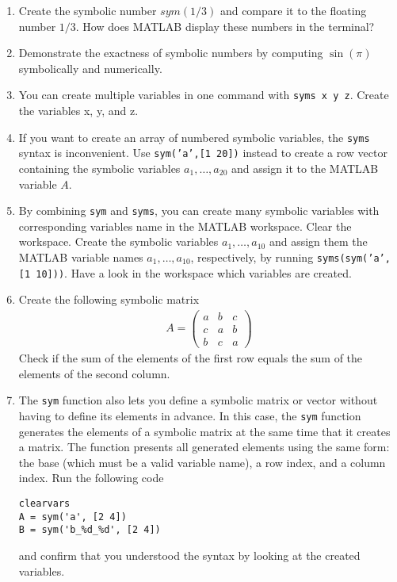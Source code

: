 \begin{enumerate}

\item
Create the symbolic number \(sym(1/3)\) and compare it to the floating number \(1/3\).
How does MATLAB display these numbers in the terminal?

\item
Demonstrate the exactness of symbolic numbers by computing \(\sin(\pi)\) symbolically and numerically.

\item
You can create multiple variables in one command with \texttt{syms x y z}.
Create the variables x, y, and z.

\item
If you want to create an array of numbered symbolic variables, the \texttt{syms} syntax is inconvenient.
Use \texttt{sym{('a',[1 20])}} instead to create a row vector containing the symbolic variables
  \(a_{1},\ldots ,a_{20}\) and assign it to the MATLAB variable \(A\).

\item
By combining \texttt{sym} and \texttt{syms}, you can create many symbolic variables
  with corresponding variables name in the MATLAB workspace.
Clear the workspace.
Create the symbolic variables \(a_{1},\ldots ,a_{10}\)
  and assign them the MATLAB variable names \(a_{1},\ldots ,a_{10}\), respectively,
  by running \texttt{syms{(sym{('a', [1 10])})}}.
Have a look in the workspace which variables are created.

\item
Create the following symbolic matrix
\begin{align*}
A = \begin{pmatrix} a & b & c\\c & a & b\\b & c & a \end{pmatrix}
\end{align*}
Check if the sum of the elements of the first row equals the sum of the elements of the second column.

\item
The \texttt{sym} function also lets you define a symbolic matrix or vector without having to define its elements in advance.
In this case, the \texttt{sym} function generates the elements of a symbolic matrix at the same time that it creates a matrix.
The function presents all generated elements using the same form:
  the base (which must be a valid variable name), a row index, and a column index.
Run the following code
\begin{lstlisting}[style=Matlab-editor,basicstyle=\mlttfamily\scriptsize]
clearvars
A = sym('a', [2 4])
B = sym('b_%d_%d', [2 4])
\end{lstlisting}
  and confirm that you understood the syntax by looking at the created variables.

\end{enumerate}

